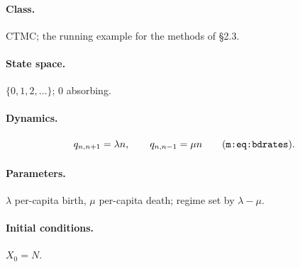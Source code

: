 \documentclass[11pt,a4paper]{article}
\begin{document}
\paragraph{Class.} CTMC; the running example for the methods of \S2.3.

\paragraph{State space.} $\{0,1,2,\ldots\}$; $0$ absorbing.

\paragraph{Dynamics.}
\[
q_{n,n+1}=\lambda n,\qquad q_{n,n-1}=\mu n
\qquad\text{(\texttt{m:eq:bdrates})}.
\]

\paragraph{Parameters.} $\lambda$ per-capita birth, $\mu$ per-capita death;
regime set by $\lambda-\mu$.

\paragraph{Initial conditions.} $X_0=N$.
\end{document}
